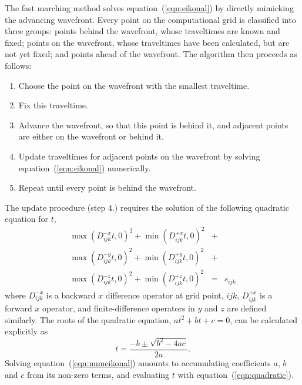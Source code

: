 \par
The fast marching method solves equation~(\ref{eqn:eikonal}) by
directly mimicking the advancing wavefront.  
Every point on the computational 
grid is classified into three groups: 
points behind the wavefront, whose traveltimes are known and fixed; 
points on the wavefront, whose traveltimes have been calculated, but
are not yet fixed; and points ahead of the wavefront.  
The algorithm then proceeds as follows: 
\begin{enumerate}
\item Choose the point on the wavefront with the smallest traveltime. 
\item Fix this traveltime.
\item Advance the wavefront, so that this point is behind it, and
adjacent points are either on the wavefront or behind it. 
\item Update traveltimes for adjacent points on the wavefront by
solving equation~(\ref{eqn:eikonal}) numerically.
\item Repeat until every point is behind the wavefront. 
\end{enumerate}


\par
The update procedure (step 4.) requires the solution of the following
quadratic equation for $t$, 
\begin{eqnarray} \label{eqn:numeikonal}
\max(D_{ijk}^{-x} t, 0)^2+
\min(D_{ijk}^{+x} t, 0)^2 & + & \nonumber \\
\max(D_{ijk}^{-y} t, 0)^2+
\min(D_{ijk}^{+y} t, 0)^2 & + & \nonumber \\
\max(D_{ijk}^{-z} t, 0)^2+
\min(D_{ijk}^{+z} t, 0)^2 & = & s_{ijk}
\end{eqnarray}
where $D_{ijk}^{-x}$ is a backward $x$ difference operator at
grid point, $ijk$, $D_{ijk}^{+x}$ is a forward $x$ operator, and
finite-difference operators in $y$ and $z$ are defined similarly. 
The roots of the quadratic equation, $a t^2 + b t + c = 0$,
can be calculated explicitly as
\begin{equation} \label{eqn:quadratic}
t = \frac{ -b \pm \sqrt{b^2 -4ac}}{2a}.
\end{equation}
Solving equation~(\ref{eqn:numeikonal}) amounts to accumulating
coefficients $a$, $b$ and $c$ from its non-zero terms, and evaluating
$t$ with equation~(\ref{eqn:quadratic}).

